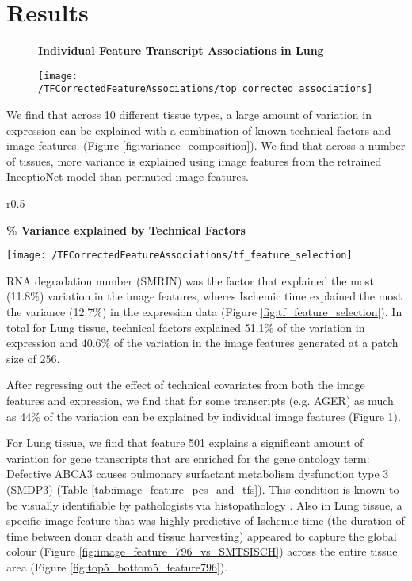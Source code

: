\documentclass{article}
\newcommand*{\figuretitle}[1]{%
    {\centering%
    \textbf{#1}%
    \par\medskip}%
}
\begin{document}
\section{Results}

\begin{figure}[h]
\centering
\figuretitle{Individual Feature Transcript Associations in Lung}
    \texttt{[image: /TFCorrectedFeatureAssociations/top\_corrected\_associations]}
 \caption{}
 \label{fig:top_corrected_associations}
\end{figure}

We find that across 10 different tissue types, a large amount of variation in expression can be explained with a combination of known technical factors and image features. (Figure \ref{fig:variance_composition}). We find that across a number of tissues, more variance is explained using image features from the retrained InceptioNet model than permuted image features.

\begin{wrapfigure}{r}{0.5\textwidth}
        \figuretitle{\% Variance explained by Technical Factors}
	\begin{center}
	\texttt{[image: /TFCorrectedFeatureAssociations/tf\_feature\_selection]} 
	\end{center}
	\caption{}
  \label{fig:tf_feature_selection}
\end{wrapfigure}


RNA degradation number (SMRIN) was the factor that explained the most (11.8\%) variation in the image features, wheres Ischemic time explained the most the variance (12.7\%) in the expression data (Figure \ref{fig:tf_feature_selection}). In total for Lung tissue, technical factors explained 51.1\% of the variation in expression and 40.6\% of the variation in the image features generated at a patch size of $256$.

After regressing out the effect of technical covariates from both the image features and expression, we find that for some transcripts (e.g. AGER) as much as 44\% of the variation can be explained by individual image features (Figure \ref{fig:top_corrected_associations}).




For Lung tissue, we find that feature 501 explains a significant amount of variation for gene transcripts that are enriched for the gene ontology term: Defective ABCA3 causes pulmonary surfactant metabolism dysfunction type 3 (SMDP3) (Table \ref{tab:image_feature_pcs_and_tfs}). This condition is known to be visually identifiable by pathologists via histopathology \cite{surfectant-dysfunction}.  Also in Lung tissue, a specific image feature that was highly predictive of Ischemic time (the duration of time between donor death and tissue harvesting) appeared to capture the global colour (Figure \ref{fig:image_feature_796_vs_SMTSISCH}) across the entire tissue area (Figure \ref{fig:top5_bottom5_feature796}).
\end{document}
